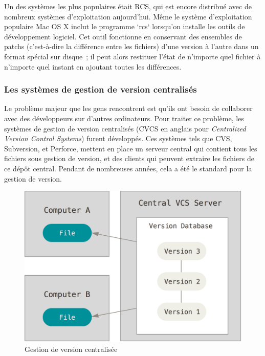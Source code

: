 Un des systèmes les plus populaires était RCS, qui est encore distribué avec de nombreux systèmes d'exploitation aujourd'hui.
Même le système d'exploitation populaire Mac OS X inclut le programme `rcs` lorsqu'on installe les outils de développement logiciel.
Cet outil fonctionne en conservant des ensembles de patchs (c'est-à-dire la différence entre les fichiers) d'une version à l'autre dans un format spécial sur disque ;
il peut alors restituer l'état de n'importe quel fichier à n'importe quel instant en ajoutant toutes les différences.

\subsubsection{Les systèmes de gestion de version centralisés}


Le problème majeur que les gens rencontrent est qu'ils ont besoin de collaborer avec des développeurs sur d'autres ordinateurs.
Pour traiter ce problème, les systèmes de gestion de version centralisés (CVCS en anglais pour \emph{Centralized Version Control Systems}) furent développés.
Ces systèmes tels que CVS, Subversion, et Perforce, mettent en place un serveur central qui contient tous les fichiers sous gestion de version, et des clients qui peuvent extraire les fichiers de ce dépôt central.
Pendant de nombreuses années, cela a été le standard pour la gestion de version.

\begin{figure}[!h]
  \centering
  \includegraphics{images/centralized}
  \caption{Gestion de version centralisée}
  \label{fig:git:centralized}
\end{figure}

